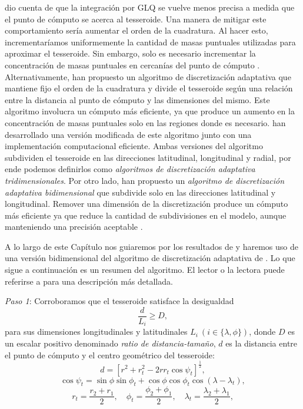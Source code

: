 \citet{ku1977} dio cuenta de que la integración por \ac{GLQ} se vuelve menos
precisa a medida que el punto de cómputo se acerca al tesseroide.
Una manera de mitigar este comportamiento sería aumentar el orden de la
cuadratura.
Al hacer esto, incrementaríamos uniformemente la cantidad de masas puntuales
utilizadas para aproximar el tesseroide.
Sin embargo, solo es necesario incrementar la concentración de masas puntuales
en cercanías del punto de cómputo \citep{uieda2016}.
Alternativamente,  \citet{li2011} han propuesto un algoritmo de discretización
adaptativa que mantiene fijo el orden de la cuadratura y divide el tesseroide
según una relación entre la distancia al punto de cómputo y las dimensiones
del mismo.
Este algoritmo involucra un cómputo más eficiente, ya que produce un aumento en
la concentración de masas puntuales solo en las regiones donde es necesario.
\citet{uieda2016} han desarrollado una versión modificada de este
algoritmo junto con una implementación computacional eficiente.
Ambas versiones del algoritmo subdividen el tesseroide en las direcciones
latitudinal, longitudinal y radial, por ende podemos definirlos como
\emph{algoritmos de discretización adaptativa tridimensionales}.
Por otro lado, \citet{lin2019} han propuesto un \emph{algoritmo de
discretización adaptativa bidimensional} que subdivide solo en las direcciones
latitudinal y longitudinal.
Remover una dimensión de la discretización produce un cómputo más eficiente ya
que reduce la cantidad de subdivisiones en el modelo, aunque manteniendo una
precisión aceptable \citep{lin2019}.

A lo largo de este Capítulo nos guiaremos por los resultados de \citet{lin2019}
y haremos uso de una versión bidimensional del algoritmo de discretización
adaptativa de \citet{uieda2016}.
Lo que sigue a continuación es un resumen del algoritmo. El lector o la lectora
puede referirse a \citet{uieda2016} para una descripción más detallada.

\textit{Paso 1}: Corroboramos que el tesseroide satisface la
desigualdad
%
\begin{equation}
    \frac{d}{L_i} \geq D,
    \label{eq:condition}
\end{equation}
%
para sus dimensiones longitudinales y latitudinales
$L_i\ (i \in \{\lambda, \phi\})$,
donde $D$ es un escalar positivo denominado \emph{ratio de distancia-tamaño},
$d$ es la distancia entre el punto de cómputo y el centro geométrico del
tesseroide:
%
\begin{equation}
    d = \left[
        r^2 + r_t^2 - 2 r r_t \cos\psi_t
        \right]^{\frac{1}{2}} ,
    \label{eq:distance}
\end{equation}
%
\begin{equation}
    \cos\psi_t =
        \sin\phi\sin\phi_t + \cos\phi\cos\phi_t\cos(\lambda - \lambda_t),
\end{equation}
%
\begin{equation}
    r_t = \frac{r_2 + r_1}{2}, \quad
    \phi_t = \frac{\phi_2 + \phi_1}{2}, \quad
    \lambda_t = \frac{\lambda_2 + \lambda_1}{2},
\end{equation}

